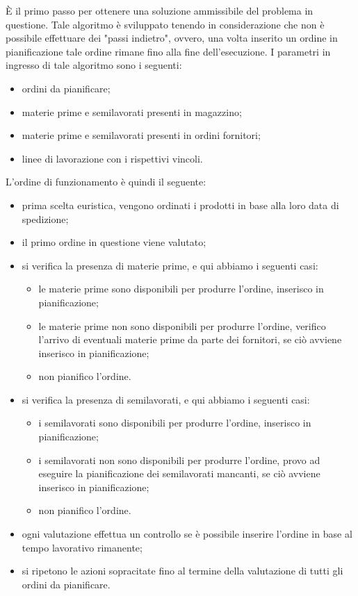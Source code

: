 È il primo passo per ottenere una soluzione ammissibile del problema in questione. Tale algoritmo è sviluppato tenendo in considerazione che non è possibile effettuare dei "passi indietro",
ovvero, una volta inserito un ordine in pianificazione tale ordine rimane fino alla fine dell'esecuzione. I parametri in ingresso di tale algoritmo sono i seguenti:
\begin{itemize}
    \item ordini da pianificare;
    \item materie prime e semilavorati presenti in magazzino;
    \item materie prime e semilavorati presenti in ordini fornitori;
    \item linee di lavorazione con i rispettivi vincoli.
\end{itemize}

L'ordine di funzionamento è quindi il seguente:

\begin{itemize}
    \item prima scelta euristica, vengono ordinati i prodotti in base alla loro data di spedizione;
    \item il primo ordine in questione viene valutato;
    \item si verifica la presenza di materie prime, e qui abbiamo i seguenti casi:
            \begin{itemize}
                \item le materie prime sono disponibili per produrre l'ordine, inserisco in pianificazione;
                \item le materie prime non sono disponibili per produrre l'ordine, verifico l'arrivo di eventuali materie prime da parte dei fornitori,
                 se ciò avviene inserisco in pianificazione;
                \item non pianifico l'ordine.
            \end{itemize}
    \item si verifica la presenza di semilavorati, e qui abbiamo i seguenti casi:
            \begin{itemize}
                \item i semilavorati sono disponibili per produrre l'ordine, inserisco in pianificazione;
                \item i semilavorati non sono disponibili per produrre l'ordine, provo ad eseguire la pianificazione dei semilavorati mancanti, se ciò avviene
                inserisco in pianificazione;
                \item non pianifico l'ordine.
            \end{itemize}
    \item ogni valutazione effettua un controllo se è possibile inserire l'ordine in base al tempo lavorativo rimanente;
    \item si ripetono le azioni sopracitate fino al termine della valutazione di tutti gli ordini da pianificare.
\end{itemize}

